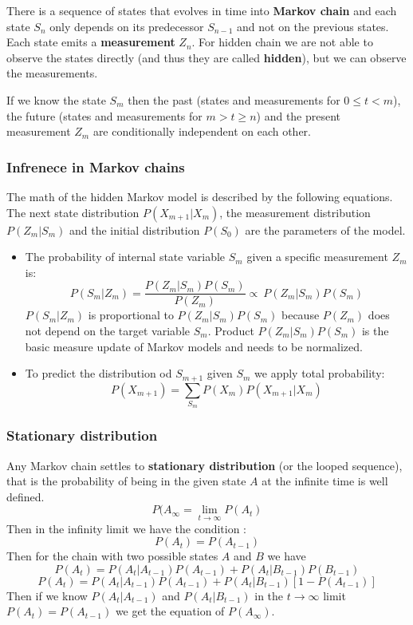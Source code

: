 \documentclass[a4paper,10pt]{article}
\begin{document}
There is a sequence of states that evolves in time into \textbf{Markov chain} and each state $S_n$ only depends on its predecessor $S_{n-1}$ and not on the previous states. Each state emits a \textbf{measurement} $Z_n$. For hidden chain we are not able to observe the states directly (and thus they are called \textbf{hidden}), but we can observe the measurements.

If we know the state $S_m$ then the past (states and measurements for $0 \leq t < m$), the future (states and measurements for $m > t \geq n$) and the present measurement $Z_m$ are conditionally independent on each other.
\subsubsection{Infrenece in Markov chains}

The math of the hidden Markov model is described by the following equations. The next state distribution $P(X_{m+1}|X_m)$, the measurement distribution $P(Z_m|S_m)$ and the initial distribution $P(S_0)$ are the parameters of the model.

\begin{itemize}
\item The probability of internal state variable $S_m$ given a specific measurement $Z_m$ is:
\[ P(S_m|Z_m) = \frac{ P(Z_m|S_m) P(S_m)}{P(Z_m)} \propto\ P(Z_m|S_m) P(S_m) \]
$P(S_m|Z_m)$  is proportional to $P(Z_m|S_m) P(S_m)$ because $P(Z_m)$ does not depend on the target variable $S_m$. Product $P(Z_m|S_m) P(S_m)$ is the basic measure update of Markov models and needs to be normalized.

\item To predict the distribution od $S_{m+1}$ given $S_m$ we apply total probability:
\[ P(X_{m+1}) = \sum_{S_m} P(X_m)P(X_{m+1}|X_m) \]
\end{itemize}

\subsubsection{Stationary distribution}

Any Markov chain settles to \textbf{stationary distribution} (or the looped sequence), that is the probability of being in the given state $A$ at the infinite time is well defined.
\[P(A_{\infty} = \lim_{t \rightarrow \infty} P(A_t) \]
Then in the infinity limit we have the condition :
\[ P(A_t) = P(A_{t-1}) \]
Then for the chain with two possible states $A$ and $B$ we have
\[ P(A_t) = P(A_t|A_{t-1}) P(A_{t-1}) +P(A_t|B_{t-1}) P(B_{t-1}) \]
\[ P(A_t) = P(A_t|A_{t-1}) P(A_{t-1}) +P(A_t|B_{t-1}) [1 - P(A_{t-1}) ] \]
Then if we know $P(A_t|A_{t-1})$ and $P(A_t|B_{t-1})$ in the $t \rightarrow \infty$ limit  $P(A_t)= P(A_{t-1})$ we get the equation of  $P(A_{\infty})$. 
\end{document}
